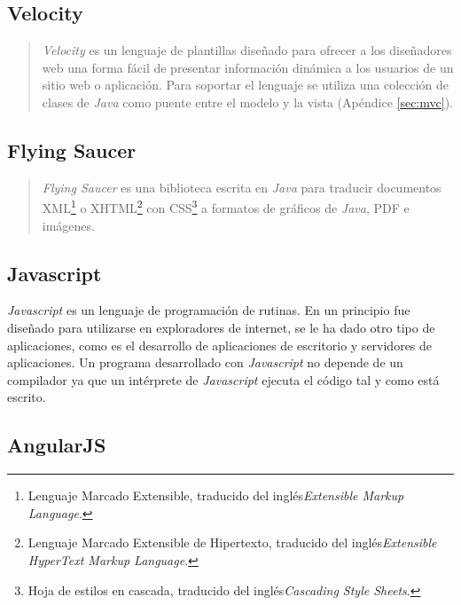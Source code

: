 \subsection{Velocity}\label{sec:velocity}
\begin{quote}
	\textit{Velocity} es un lenguaje de plantillas diseñado para ofrecer a los diseñadores web una forma fácil de presentar información dinámica a los usuarios de un sitio web o aplicación. Para soportar el lenguaje se utiliza una colección de clases de \textit{Java} como puente entre el modelo y la vista\cite{MasteringApacheVelocity} (Apéndice \ref{sec:mvc}).
\end{quote}

\subsection{Flying Saucer}\label{sec:flying-saucer}
\begin{quote}
	\textit{Flying Saucer} es una biblioteca escrita en \textit{Java} para traducir documentos XML\footnote{Lenguaje Marcado Extensible, traducido del inglés\textit{Extensible Markup Language}.} o XHTML\footnote{Lenguaje Marcado Extensible de Hipertexto, traducido del inglés\textit{Extensible HyperText Markup Language}.} con CSS\footnote{Hoja de estilos en cascada, traducido del inglés\textit{Cascading Style Sheets}.} a formatos de gráficos de \textit{Java}, PDF e imágenes\cite{FlyingSaucer}.
\end{quote}

\subsection{Javascript}\label{sec:javascript}
\textit{Javascript} es un lenguaje de programación de rutinas. En un principio fue diseñado para utilizarse en exploradores de internet, se le ha dado otro tipo de aplicaciones, como es el desarrollo de aplicaciones de escritorio y servidores de aplicaciones. Un programa desarrollado con \textit{Javascript} no depende de un compilador ya que un intérprete de \textit{Javascript} ejecuta el código tal y como está escrito\cite{LearningWebDesign}.

\subsection{AngularJS}\label{sec:angularjs}

